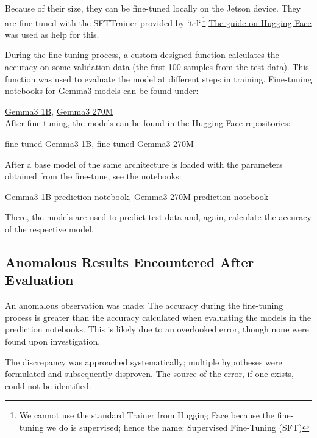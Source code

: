 \documentclass{article}
\begin{document}
Because of their size, they can be fine-tuned locally on the Jetson device. They are fine-tuned with the SFTTrainer provided by `trl`.\footnote{We cannot use the standard Trainer from Hugging Face because the fine-tuning we do is supervised; hence the name: Supervised Fine-Tuning (SFT)} \href{https://huggingface.co/docs/trl/en/sft_trainer}{The guide on Hugging Face} was used as help for this.

During the fine-tuning process, a custom-designed function calculates the accuracy on some validation data (the first 100 samples from the test data). This function was used to evaluate the model at different steps in training. Fine-tuning notebooks for Gemma3 models can be found under:

\href{https://github.com/AntonStantan/matura/blob/main/pre-trained-tranformers/big_gemma_huggingface.ipynb}{Gemma3 1B}, \href{https://github.com/AntonStantan/matura/blob/main/pre-trained-tranformers/gemma_huggingface.ipynb}{Gemma3 270M}
\\[2em]
After fine-tuning, the models can be found in the Hugging Face repositories:

\href{https://huggingface.co/AntonBOOM/big_output}{fine-tuned Gemma3 1B},
\href{https://huggingface.co/AntonBOOM/output1}{fine-tuned Gemma3 270M}

After a base model of the same architecture is loaded with the parameters obtained from the fine-tune, see the notebooks:

\href{https://github.com/AntonStantan/matura/blob/main/pre-trained-tranformers/big_gemma_huggingface_predict.ipynb}{Gemma3 1B prediction notebook},
\href{https://github.com/AntonStantan/matura/blob/main/pre-trained-tranformers/gemma-huggingface-predict.ipynb}{Gemma3 270M prediction notebook}

There, the models are used to predict test data and, again, calculate the accuracy of the respective model.

\subsection{Anomalous Results Encountered After Evaluation}

An anomalous observation was made: The accuracy during the fine-tuning process is greater than the accuracy calculated when evaluating the models in the prediction notebooks. This is likely due to an overlooked error, though none were found upon investigation.

The discrepancy was approached systematically; multiple hypotheses were formulated and subsequently disproven. The source of the error, if one exists, could not be identified.
\end{document}
